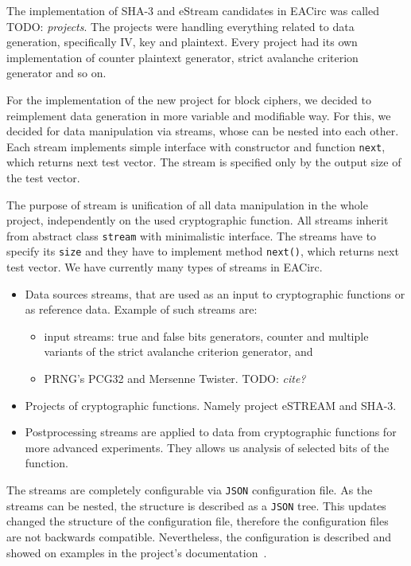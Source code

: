 \documentclass[
  print, %
  Table,   %
  nolof,     %
  nolot,     %
  11pt, %
  oneside  %
]{fithesis3}
\newcommand{\todo}[1]{TODO: \textit{#1}}
\begin{document}
The implementation of SHA-3 and eStream candidates in EACirc was called \todo{projects}. The projects were handling everything related to data generation, specifically IV, key and plaintext. Every project had its own implementation of counter plaintext generator, strict avalanche criterion generator and so on.

For the implementation of the new project for block ciphers, we decided to reimplement data generation in more variable and modifiable way. For this, we decided for data manipulation via streams, whose can be nested into each other. Each stream implements simple interface with constructor and function \texttt{next}, which returns next test vector. The stream is specified only by the output size of the test vector.

The purpose of stream is unification of all data manipulation in the whole project, independently on the used cryptographic function. All streams inherit from abstract class \texttt{stream} with minimalistic interface. The streams have to specify its \texttt{size} and they have to implement method \texttt{next()}, which returns next test vector. We have currently many types of streams in EACirc.

\begin{itemize}
    \item Data sources streams, that are used as an input to cryptographic functions or as reference data. Example of such streams are:
    \begin{itemize}
        \item input streams: true and false bits generators, counter and multiple variants of the strict avalanche criterion generator, and
        \item PRNG's PCG32 and Mersenne Twister. \todo{cite?}
    \end{itemize}
    \item Projects of cryptographic functions. Namely project eSTREAM and SHA-3.
    \item Postprocessing streams are applied to data from cryptographic functions for more advanced experiments. They allows us analysis of selected bits of the function.
\end{itemize}

The streams are completely configurable via \texttt{JSON} configuration file. As the streams can be nested, the structure is described as a \texttt{JSON} tree. This updates changed the structure of the configuration file, therefore the configuration files are not backwards compatible. Nevertheless, the configuration is described and showed on examples in the project's documentation~\cite{EACirc-wiki-streams}.
\end{document}
